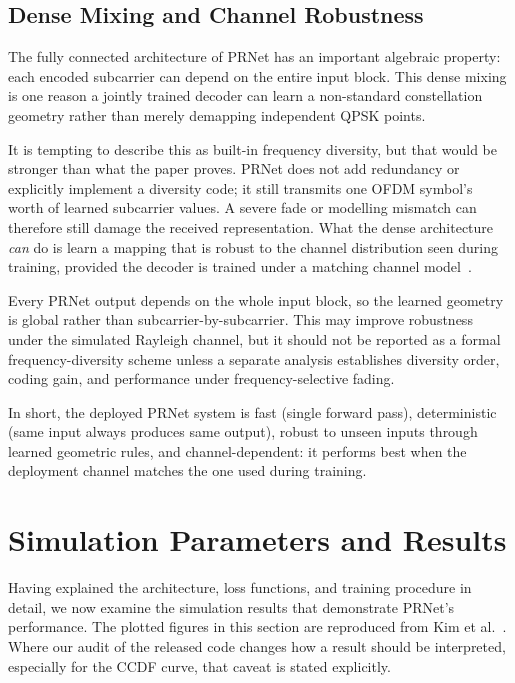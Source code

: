 \subsection{Dense Mixing and Channel Robustness}

The fully connected architecture of PRNet has an important algebraic property:
each encoded subcarrier can depend on the entire input block.  This dense
mixing is one reason a jointly trained decoder can learn a non-standard
constellation geometry rather than merely demapping independent QPSK points.

It is tempting to describe this as built-in frequency diversity, but that
would be stronger than what the paper proves.  PRNet does not add redundancy
or explicitly implement a diversity code; it still transmits one OFDM symbol's
worth of learned subcarrier values.  A severe fade or modelling mismatch can
therefore still damage the received representation.  What the dense
architecture \emph{can} do is learn a mapping that is robust to the channel
distribution seen during training, provided the decoder is trained under a
matching channel model~\cite{kim2017novel}.

\begin{keyinsight}
    Every PRNet output depends on the whole input block, so the learned
    geometry is global rather than subcarrier-by-subcarrier.  This may improve
    robustness under the simulated Rayleigh channel, but it should not be
    reported as a formal frequency-diversity scheme unless a separate analysis
    establishes diversity order, coding gain, and performance under
    frequency-selective fading.
\end{keyinsight}

In short, the deployed PRNet system is fast (single forward pass),
deterministic (same input always produces same output), robust to unseen
inputs through learned geometric rules, and channel-dependent: it performs best
when the deployment channel matches the one used during training.


\section{Simulation Parameters and Results}
\label{sec:prnet_results}

Having explained the architecture, loss functions, and training procedure in
detail, we now examine the simulation results that demonstrate PRNet's
performance.  The plotted figures in this section are reproduced from
Kim et al.~\cite{kim2017novel}.  Where our audit of the released code changes
how a result should be interpreted, especially for the CCDF curve, that caveat
is stated explicitly.


